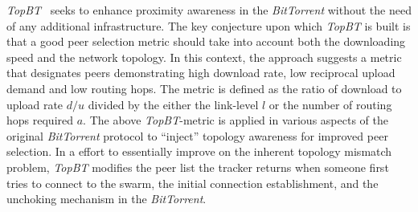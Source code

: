 \emph{TopBT}~\cite{RTLCGZ2010} seeks to enhance 
proximity awareness in the {\sl BitTorrent}
without the need of any additional infrastructure.
The key conjecture upon which \emph{TopBT} is built is that 
a good peer selection metric should take into account both the
downloading speed and the network topology. 
In this context, the approach suggests a metric that designates
peers demonstrating high download rate, low reciprocal upload demand 
and low routing hops.
The metric is defined as the ratio of download to upload rate ${d}/{u}$
divided by the either the link-level $l$ or the number of routing hops required $a$.
The above \emph{TopBT}-metric is applied in various
aspects of the original {\sl BitTorrent} protocol to ``inject'' topology
awareness for improved peer selection. 
In a effort to essentially improve on the inherent topology mismatch problem,
\emph{TopBT} modifies the peer list the
tracker returns when someone first tries to connect to the swarm,
the initial connection establishment, and the
unchoking mechanism in the {\sl BitTorrent}.
%
%
